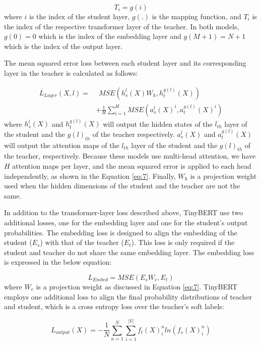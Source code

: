 \documentclass{article}
\begin{document}
\begin{equation}
    T_i = g(i)
\end{equation}
where $i$ is the index of the student layer, $g(.)$ is the mapping function, and $T_i$ is the index of the respective transformer layer of the teacher. In both models, $g(0) = 0$ which is the index of the embedding layer and $g(M + 1) = N + 1$ which is the index of the output layer.

The mean squared error loss between each student layer and its corresponding layer in the teacher is calculated as follows: 

\begin{align} \label{eq:7}
    L_{Layer}(X, l) =  & \hspace{5pt} MSE(h_s^l(X) W_{h} , h_t^{g(l)}(X))\\
                     & + \frac{1}{H}\sum^H_{i=1} MSE(a_s^l(X)^i, a_t^{g(l)}(X)^i) \nonumber
\end{align}
where $h_s^l(X)$ and $h_t^{g(l)}(X)$ will output the hidden states of the $l_{th}$ layer of the student and the $g(l)_{th}$ of the teacher respectively. $a_s^l(X)$ and $a_t^{g(l)}(X)$ will output the attention maps of the $l_{th}$ layer of the student and the $g(l)_{th}$ of the teacher, respectively. Because these models use multi-head attention, we have $H$ attention maps per layer, and the mean squared error is applied to each head independently, as shown in the Equation \ref{eq:7}. Finally, $W_{h}$ is a projection weight used when the hidden dimensions of the student and the teacher are not the same.

In addition to the transformer-layer loss described above, TinyBERT use two additional losses, one for the embedding layer and one for the student's output probabilities. The embedding loss is designed to align the embedding of the student ($E_s$) with that of the teacher ($E_t$). This loss is only required if the student and teacher do not share the same embedding layer. The embedding loss is expressed in the below equation:

\begin{equation}
    L_{Embed} = MSE(E_{s} W_{e} , E_t)
\end{equation}
where $W_{e}$ is a projection weight as discussed in Equation \ref{eq:7}. TinyBERT employs one additional loss to align the final probability distributions of teacher and student, which is a cross entropy loss over the teacher's soft labels:

\begin{equation}\label{eq:8}
    L_{output}(X) = -\frac{1}{N}\sum^{N}_{n=1}\sum^{|V|}_{i=1} f_{t}(X)^{n}_{i}ln(f_{s}(X)_{i}^{n})
\end{equation}
\end{document}
